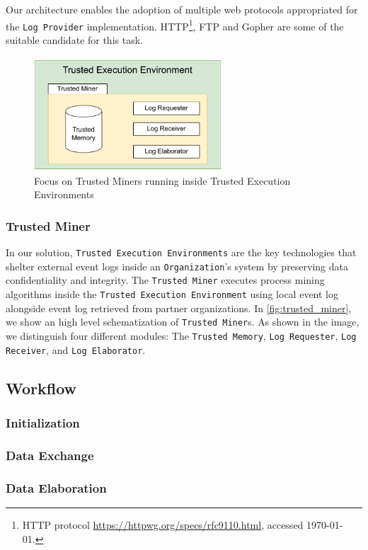 Our architecture enables the adoption of multiple web protocols appropriated for the \texttt{Log Provider} implementation. HTTP\footnote{HTTP protocol \url{https://httpwg.org/specs/rfc9110.html}, accessed \today.}, FTP and Gopher are some of the suitable candidate for this task.
\label{fig:trusted_miner}
\begin{figure}[t]
\centering
\includegraphics[width=7cm]{content/figures/Trusted_miner.pdf}
\caption{Focus on Trusted Miners running inside Trusted Execution Environments}
\label{fig:implementation}
\end{figure}
\subsubsection{Trusted Miner}
In our solution, \texttt{Trusted Execution Environments} are the key technologies that shelter external event logs inside an \texttt{Organization}'s system by preserving data confidentiality and integrity. The \texttt{Trusted Miner} executes process mining algorithms inside the \texttt{Trusted Execution Environment} using local event log alongside event log retrieved from partner organizations. In \cref{fig:trusted_miner}, we show an high level schematization of \texttt{Trusted Miner}s. As shown in the image, we distinguish four different modules: The \texttt{Trusted Memory}, \texttt{Log Requester}, \texttt{Log Receiver}, and \texttt{Log Elaborator}.

\subsection{Workflow}
\subsubsection{Initialization}
\subsubsection{Data Exchange}
\subsubsection{Data Elaboration}



